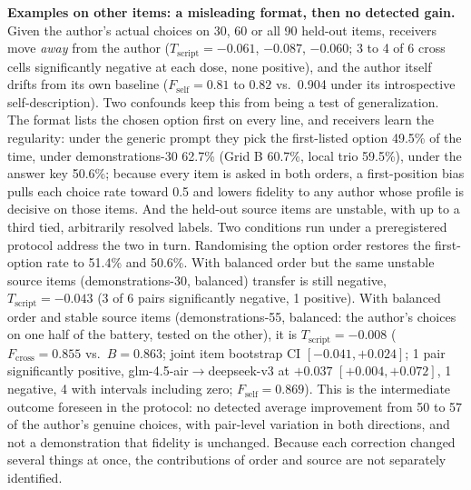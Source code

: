 \documentclass[11pt]{article}
\newcommand{\Fself}{F_{\mathrm{self}}}
\newcommand{\Fcross}{F_{\mathrm{cross}}}
\newcommand{\B}{B}
\newcommand{\Tscript}{T_{\mathrm{script}}}
\begin{document}
\textbf{Examples on other items: a misleading format, then no detected
gain.} Given the author's actual choices on 30, 60 or all 90 held-out items,
receivers move \emph{away} from the author ($\Tscript = -0.061$, $-0.087$,
$-0.060$; 3 to 4 of 6 cross cells significantly negative at each dose, none
positive), and the author itself drifts from its own baseline
($\Fself = 0.81$ to $0.82$ vs.\ 0.904 under its introspective
self-description). Two confounds keep this from being a test of
generalization. The format lists the chosen option first on every line, and
receivers learn the regularity: under the generic prompt they pick the
first-listed option 49.5\% of the time, under demonstrations-30 62.7\% (Grid
B 60.7\%, local trio 59.5\%), under the answer key 50.6\%; because every
item is asked in both orders, a first-position bias pulls each choice rate
toward 0.5 and lowers fidelity to any author whose profile is decisive on
those items. And the held-out source items are unstable, with up to a
third tied, arbitrarily resolved labels. Two conditions run under a preregistered protocol address the two
in turn.
Randomising the option order restores the first-option rate to 51.4\% and
50.6\%. With balanced order but the same unstable source items
(demonstrations-30, balanced) transfer is still negative,
$\Tscript = -0.043$ (3 of 6 pairs significantly negative, 1 positive). With
balanced order and stable source items (demonstrations-55, balanced: the
author's choices on one half of the battery, tested on the other), it is
$\Tscript = -0.008$ ($\Fcross = 0.855$ vs.\ $\B = 0.863$; joint item
bootstrap CI $[-0.041, +0.024]$; 1 pair significantly positive,
glm-4.5-air$\to$deepseek-v3 at $+0.037$ $[+0.004, +0.072]$, 1 negative, 4
with intervals including zero; $\Fself = 0.869$). This is the intermediate outcome foreseen in the
protocol: no detected average improvement from 50 to 57 of the author's
genuine choices, with pair-level variation in both directions, and not a
demonstration that fidelity is unchanged. Because each correction changed
several things at once, the contributions of order and source are not
separately identified.
\end{document}
